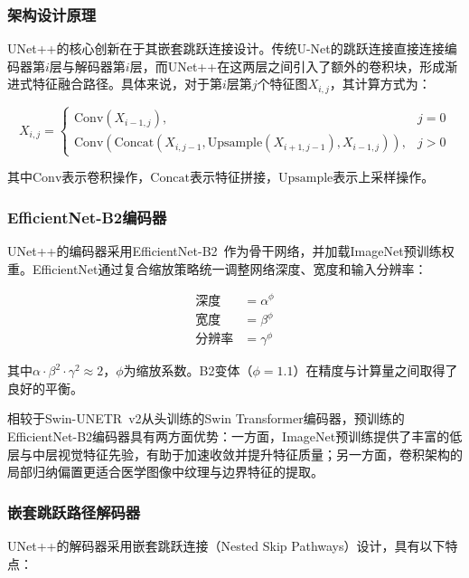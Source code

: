 \documentclass[12pt, a4paper]{article}
\newcommand{\mrm}[1]{\mathrm{#1}}
\begin{document}
\subsubsection{架构设计原理}

UNet++的核心创新在于其嵌套跳跃连接设计。传统U-Net的跳跃连接直接连接编码器第$i$层与解码器第$i$层，而UNet++在这两层之间引入了额外的卷积块，形成渐进式特征融合路径。具体来说，对于第$i$层第$j$个特征图$X_{i,j}$，其计算方式为：

\begin{equation}
    X_{i,j} = 
    \begin{cases} 
    \mrm{Conv}(X_{i-1,j}), & j=0 \\
    \mrm{Conv}\left(\mrm{Concat}\left(X_{i,j-1}, \mrm{Upsample}(X_{i+1,j-1}), X_{i-1,j}\right)\right), & j>0 
    \end{cases}
\end{equation}

其中$\mrm{Conv}$表示卷积操作，$\mrm{Concat}$表示特征拼接，$\mrm{Upsample}$表示上采样操作。

\subsubsection{EfficientNet-B2编码器}

UNet++的编码器采用EfficientNet-B2~\cite{tan2019efficientnet}作为骨干网络，并加载ImageNet预训练权重。EfficientNet通过复合缩放策略统一调整网络深度、宽度和输入分辨率：

\begin{align}
    \text{深度} &= \alpha^\phi \\
    \text{宽度} &= \beta^\phi \\
    \text{分辨率} &= \gamma^\phi
\end{align}

其中$\alpha \cdot \beta^2 \cdot \gamma^2 \approx 2$，$\phi$为缩放系数。B2变体（$\phi=1.1$）在精度与计算量之间取得了良好的平衡。

相较于Swin-UNETR~v2从头训练的Swin Transformer编码器，预训练的EfficientNet-B2编码器具有两方面优势：一方面，ImageNet预训练提供了丰富的低层与中层视觉特征先验，有助于加速收敛并提升特征质量；另一方面，卷积架构的局部归纳偏置更适合医学图像中纹理与边界特征的提取。

\subsubsection{嵌套跳跃路径解码器}

UNet++的解码器采用嵌套跳跃连接（Nested Skip Pathways）设计，具有以下特点：
\end{document}
